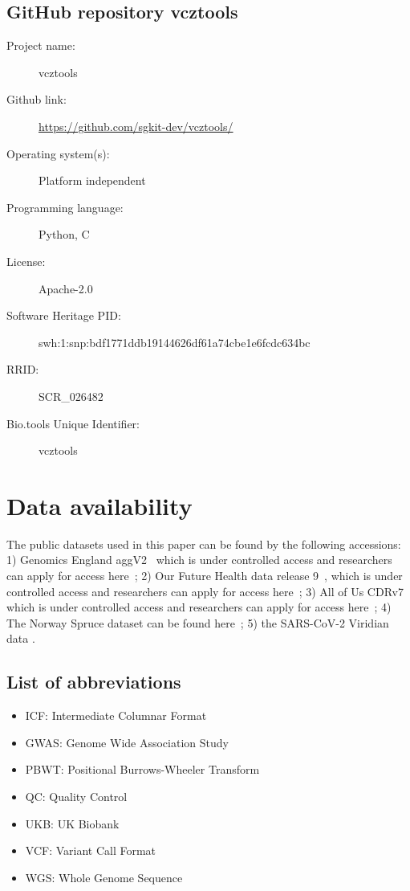 \documentclass[a4paper,num-refs]{oup-contemporary}
\begin{document}
\subsection{GitHub repository vcztools}
\begin{description}
\item[Project name:]  vcztools
\item[Github link:] \url{https://github.com/sgkit-dev/vcztools/}
\item[Operating system(s):] Platform independent
\item[Programming language:] Python, C
\item[License:] Apache-2.0
\item[Software Heritage PID:]
swh:1:snp:bdf1771ddb19144626df61a74cbe1e6fcdc634bc \cite{vcztools-swh}
\item[RRID:] SCR\_026482
\item[Bio.tools Unique Identifier:] vcztools
\end{description}

\section{Data availability}
The public datasets used in this paper can be found by the following
accessions:
1) Genomics England aggV2~\cite{gel-aggv2} 
which is under controlled access and researchers can apply for access
here~\citep{gel-join};
2) Our Future Health data release 9~\cite{ofhdatarelease9},
which is under controlled access and researchers can apply for access here~\citep{ofh-apply-for-access};
3) All of Us CDRv7~\citep{aou-cdrv7}
which is under controlled access and researchers can apply for access
here~\citep{aou-apply};
4) The Norway Spruce dataset can be found here~\cite{plantgenie};
5) the SARS-CoV-2 Viridian data \cite{kelleher2025viridian}.

\subsection{List of abbreviations}

\begin{itemize}
    \item ICF: Intermediate Columnar Format
    \item GWAS: Genome Wide Association Study
    \item PBWT: Positional Burrows-Wheeler Transform
    \item QC: Quality Control
    \item UKB: UK Biobank
    \item VCF: Variant Call Format
    \item WGS: Whole Genome Sequence
\end{itemize}
\end{document}
